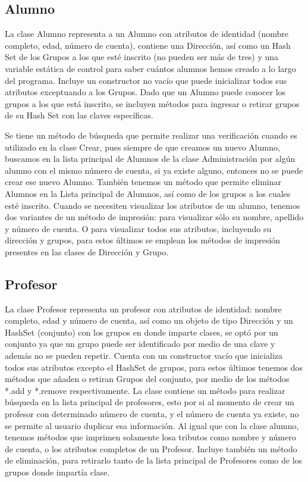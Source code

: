 \documentclass[11pt]{article}
\begin{document}
\subsection{Alumno}
\par

La clase Alumno representa a un Alumno con atributos de identidad (nombre completo, edad, número de cuenta), contiene una Dirección, así como un Hash Set de los Grupos a los que esté inscrito (no pueden ser más de tres) y una variable estática de control para saber cuántos alumnos hemos creado a lo largo del programa. Incluye un constructor no vacío que puede inicializar todos sus atributos exceptuando a los Grupos. Dado que un Alumno puede conocer los grupos a los que está inscrito, se incluyen métodos para ingresar o retirar grupos de su Hash Set con las claves específicas. 
\par
Se tiene un método de búsqueda que permite realizar una verificación cuando es utilizado en la clase Crear, pues siempre de que creamos un nuevo Alumno, buscamos en la lista principal de Alumnos de la clase Administración por algún alumno con el mismo número de cuenta, si ya existe alguno, entonces no se puede crear ese nuevo Alumno. También tenemos un método que permite eliminar Alumnos en la Lista principal de Alumnos, así como de los grupos a los cuales esté inscrito. Cuando se necesiten visualizar los atributos de un alumno, tenemos dos variantes de un método de impresión: para visualizar sólo su nombre, apellido y número de cuenta. O para visualizar todos sus atributos, incluyendo su dirección y grupos, para estos últimos se emplean los métodos de impresión presentes en las clases de Dirección y Grupo.

\subsection{Profesor}
\par

La clase Profesor representa un profesor con atributos de identidad: nombre completo, edad y número de cuenta, así como un objeto de tipo Dirección y un HashSet (conjunto) con los grupos en donde imparte clases, se optó por un conjunto ya que un grupo puede ser identificado por medio de una clave y además no se pueden repetir. Cuenta con un constructor vacío que inicializa todos sus atributos excepto el HashSet de grupos, para estos últimos tenemos dos métodos que añaden o retiran Grupos del conjunto, por medio de los métodos *.add y *.remove respectivamente. La clase contiene un método para realizar búsqueda en la lista principal de profesores, esto por si al momento de crear un profesor con determinado número de cuenta, y el número de cuenta ya existe, no se permite al usuario duplicar esa información. Al igual que con la clase alumno, tenemos métodos que imprimen solamente losa tributos como nombre y número de cuenta, o los atributos completos de un Profesor. Incluye también un método de eliminación, para retirarlo tanto de la lista principal de Profesores como de los grupos donde impartía clase.
\end{document}
